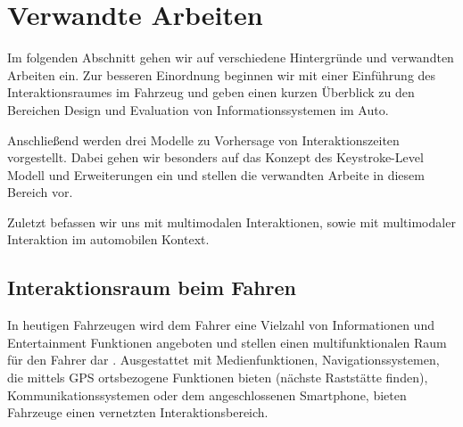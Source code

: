 \chapter{Verwandte Arbeiten}\label{cha:verwandteArbeiten}
Im folgenden Abschnitt gehen wir auf verschiedene Hintergründe und verwandten Arbeiten ein. 
Zur besseren Einordnung beginnen wir mit einer Einführung des Interaktionsraumes im Fahrzeug und geben einen kurzen Überblick zu den Bereichen Design und Evaluation von Informationssystemen im Auto.

Anschließend werden drei Modelle zu Vorhersage von Interaktionszeiten vorgestellt. 
Dabei gehen wir besonders auf das Konzept des Keystroke-Level Modell und Erweiterungen ein und stellen die verwandten Arbeite in diesem Bereich vor. 

Zuletzt befassen wir uns mit multimodalen Interaktionen, sowie mit multimodaler Interaktion im automobilen Kontext.   

\section{Interaktionsraum beim Fahren}
In heutigen Fahrzeugen wird dem Fahrer eine Vielzahl von Informationen und Entertainment Funktionen angeboten und stellen einen multifunktionalen Raum für den Fahrer dar \citep{Kern:2009}. 
Ausgestattet mit Medienfunktionen,  Navigationssystemen, die mittels GPS ortsbezogene Funktionen bieten (nächste Raststätte finden), Kommunikationssystemen oder dem angeschlossenen Smartphone, bieten Fahrzeuge einen vernetzten Interaktionsbereich.

